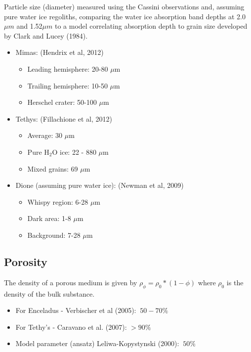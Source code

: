 \documentclass[11pt]{article} %
\begin{document}
\begin{itemize}
Particle size (diameter) measured using the Cassini observations and, assuming pure water ice regoliths, comparing the water ice absorption band depths at 2.0$\mu m$ and 1.52$\mu m$ to a model correlating absorption depth to grain size developed by Clark and Lucey (1984).

	\begin{itemize}
	\item Mimas: (Hendrix et al, 2012)
	\begin{itemize}
		\item Leading hemisphere: 20-80 $\mu$m
		\item Trailing hemisphere: 10-50 $\mu$m
		\item Herschel crater: 50-100 $\mu$m
	\end{itemize}

	\item Tethys: (Fillachione et al, 2012)
	\begin{itemize}
		\item Average: 30 $\mu$m
		\item Pure H$_{2}$O ice: 22 - 880 $\mu$m
		\item Mixed grains: 69 $\mu$m
	\end{itemize}

	\item Dione (assuming pure water ice): (Newman et al, 2009)
	\begin{itemize}
		\item Whispy region: 6-28 $\mu$m
		\item Dark area: 1-8 $\mu$m
		\item Background: 7-28 $\mu$m
	\end{itemize}
	\end{itemize}

\subsection{Porosity}
\label{sec:porosity}

	The density of a porous medium is given by $\rho_{\phi} = \rho_{0}*(1-\phi)$ where $\rho_{0}$ is the density of the bulk substance. 

	\begin{itemize}
	\item For Enceladus - Verbischer et al (2005): $~50-70\%$
	\item For Tethy's - Caravano et al. (2007): $>90\%$ 
	\item Model parameter (ansatz) Leliwa-Kopystynski (2000): $~50\%$
	\end{itemize}
	

\end{itemize}
\end{document}

